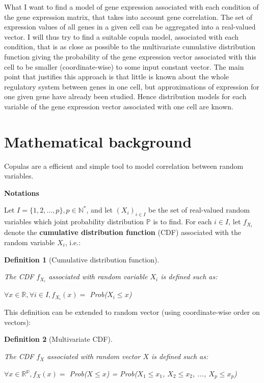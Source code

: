 \documentclass{report}
\newtheorem{definition}{Definition}[section]
\begin{document}
What I want to find a model of gene expression associated with each condition of the gene expression matrix, that takes into account gene correlation. The set of expression values of all genes in a given cell can be aggregated into a real-valued vector. I will thus try to find a suitable copula model, associated with each condition, that is as close as possible to the multivariate cumulative distribution function giving the probability of the gene expression vector associated with this cell to be smaller (coordinate-wise) to some input constant vector. The main point that justifies this approach is that little is known about the whole regulatory system between genes in one cell, but approximations of expression for one given gene have already been studied. Hence distribution models for each variable of the gene expression vector associated with one cell are known.

\section{Mathematical background}

Copulas are a efficient and simple tool to model correlation between random variables. 

\bigskip
\noindent \textbf{Notations}
\bigskip

Let $I=\{1, 2, ..., p\}, p \in \mathbb{N^*}$, and let $(X_i)_{i \in I}$ be the set of real-valued random variables which joint probability distribution $\mathbb{P}$ is to find. For each $i \in I$, let $f_{X_i}$ denote the \textbf{cumulative distribution function} (CDF) associated with the random variable $X_i$, i.e.:

\begin{definition}[Cumulative distribution function]\label{cdf}{The CDF $f_{X_i}$ associated with random variable $X_i$ is defined such as:\begin{center} $\forall x \in \mathbb{R}, \forall i \in I, f_{X_i}(x) =$ \textit{Prob}($X_i \leq x$)\end{center}}\end{definition}

This definition can be extended to random vector (using coordinate-wise order on vectors):

\begin{definition}[Multivariate CDF]\label{cdf}{The CDF $f_{X}$ associated with random vector $X$ is defined such as:\begin{center} $\forall x \in \mathbb{R^{p}}, f_{X}(x) =$ \textit{Prob}($X \leq x$) = \textit{Prob}($X_1 \leq x_1$, $X_2 \leq x_2$, ..., $X_p \leq x_p$) \end{center}}\end{definition}
\end{document}
